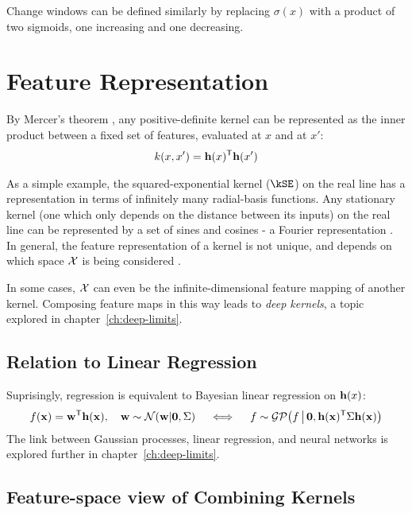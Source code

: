 Change windows can be defined similarly by replacing $\sigma(x)$ with a product of two sigmoids, one increasing and one decreasing.




\section{Feature Representation}
%
By Mercer's theorem \citep{mercer1909functions},
any positive-definite kernel can be represented as the inner product between a fixed set of features, evaluated at $x$ and at $x'$:
%
\begin{align}
k(x,x') = {\bf{h}}(x){^\mathsf{T}} {\bf{h}}(x')
\end{align}

As a simple example, the squared-exponential kernel ($\kSE$) on the real line has a representation in terms of infinitely many radial-basis functions.
Any stationary kernel (one which only depends on the distance between its inputs) on the real line can be represented by a set of sines and cosines - a Fourier representation \citep{bochner1959lectures}.
In general, the feature representation of a kernel is not unique, and depends on which space $\mathcal{X}$ is being considered \citep{minh2006mercer}.

In some cases, $\mathcal{X}$ can even be the infinite-dimensional feature mapping of another kernel.  Composing feature maps in this way leads to \emph{deep kernels}, a topic explored in chapter~\ref{ch:deep-limits}.



\subsection{Relation to Linear Regression}

Suprisingly, \gp{} regression is equivalent to Bayesian linear regression on ${\bf{h}}(x)$:
%
\begin{align}
f({\bf{x}}) = {\bf{w}}{^\mathsf{T}} {\bf{h}}({\bf{x}}), \quad {\bf{w}} \sim \mathcal{N}\!\left({\bf{w}} \middle| {\bf{0}},\Sigma\right) \quad
\iff
\quad f \sim \mathcal{GP}\!\left(f \, \middle| \, {\bf{0}}, {\bf{h}}({\bf{x}}) {^\mathsf{T}} \Sigma {\bf{h}}({\bf{x}}) \right)
\end{align}
%
The link between Gaussian processes, linear regression, and neural networks is explored further in chapter~\ref{ch:deep-limits}.


\subsection{Feature-space view of Combining Kernels}

